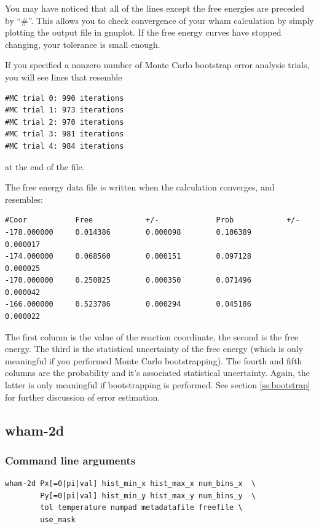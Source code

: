 \documentclass[12pt]{article}
\begin{document}
You may have noticed that all of the lines except the free energies are
preceded by ``\#''.  This allows you to check convergence of your wham
calculation by simply plotting the output file in gnuplot.  If the free
energy curves have stopped changing, your tolerance is small enough.  

If you specified a nonzero number of Monte Carlo bootstrap error analysis
trials, you will see lines that resemble

\begin{verbatim}
#MC trial 0: 990 iterations
#MC trial 1: 973 iterations
#MC trial 2: 970 iterations
#MC trial 3: 981 iterations
#MC trial 4: 984 iterations
\end{verbatim}

at the end of the file.

The free energy data file is written when the calculation converges, and
resembles: 

\begin{verbatim}
#Coor           Free            +/-             Prob            +/-
-178.000000     0.014386        0.000098        0.106389        0.000017
-174.000000     0.068560        0.000151        0.097128        0.000025
-170.000000     0.250825        0.000350        0.071496        0.000042
-166.000000     0.523786        0.000294        0.045186        0.000022
\end{verbatim}

The first column is the value of the reaction coordinate, the second is the
free energy.  The third is the statistical uncertainty of the free energy
(which is only meaningful if you performed Monte Carlo bootstrapping).  The
fourth and fifth columns are the probability and it's associated
statistical uncertainty.  Again, the latter is only meaningful if
bootstrapping is performed.  See section \ref{ss:bootstrap} for further
discussion of error estimation.

\subsection{wham-2d}

\subsubsection{Command line arguments}

\begin{verbatim}
wham-2d Px[=0|pi|val] hist_min_x hist_max_x num_bins_x  \
        Py[=0|pi|val] hist_min_y hist_max_y num_bins_y  \
        tol temperature numpad metadatafile freefile \ 
        use_mask
\end{verbatim}
\end{document}

